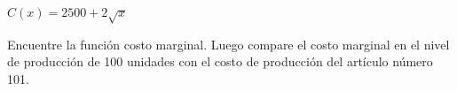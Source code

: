 \item $C(x) = 2500 + 2\sqrt{x}$
\par
Encuentre la función costo marginal. Luego compare el costo marginal en el nivel de producción de 100 unidades con el costo de producción del artículo número 101.
